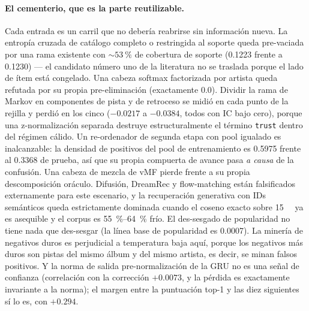\documentclass[11pt]{article}
\begin{document}
\paragraph{El cementerio, que es la parte reutilizable.} Cada entrada es un carril
que no debería reabrirse sin información nueva. La entropía cruzada de catálogo
completo o restringida al soporte queda pre-vaciada por una rama existente con
${\sim}\SI{53}{\percent}$ de cobertura de soporte (\num{0.1223} frente a
\num{0.1230}) --- el candidato número uno de la literatura no se traslada porque el
lado de ítem está congelado. Una cabeza softmax factorizada por artista queda
refutada por su propia pre-eliminación (exactamente \num{0.0}). Dividir la rama de
Markov en componentes de pista y de retroceso se midió en cada punto de la rejilla
y perdió en los cinco ($-\num{0.0217}$ a $-\num{0.0384}$, todos con IC bajo cero),
porque una z-normalización separada destruye estructuralmente el término
\texttt{trust} dentro del régimen cálido. Un re-ordenador de segunda etapa con
pool igualado es inalcanzable: la densidad de positivos del pool de entrenamiento
es \num{0.5975} frente al \num{0.3368} de prueba, así que su propia compuerta de
avance pasa \emph{a causa} de la confusión. Una cabeza de mezcla de vMF pierde
frente a su propia descomposición oráculo. Difusión, DreamRec y flow-matching están
falsificados externamente para este escenario, y la recuperación generativa con IDs
semánticos queda estrictamente dominada cuando el coseno exacto sobre
\SI{15}{\mega\byte} ya es asequible y el corpus es
\SIrange{55}{64}{\percent} frío. El des-sesgado de popularidad no tiene nada que
des-sesgar (la línea base de popularidad es \num{0.0007}). La minería de negativos
duros es perjudicial a temperatura baja aquí, porque los negativos más duros son
pistas del mismo álbum y del mismo artista, es decir, se minan falsos positivos. Y
la norma de salida pre-normalización de la GRU no es una señal de confianza
(correlación con la corrección $+\num{0.0073}$, y la pérdida es exactamente
invariante a la norma); el margen entre la puntuación top-1 y las diez siguientes
sí lo es, con $+\num{0.294}$.
\end{document}
